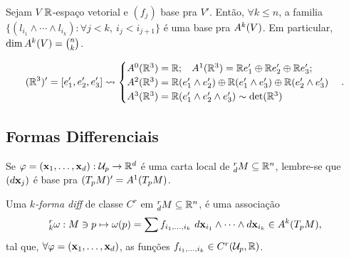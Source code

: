 \begin{theorem}
    Sejam \(V\) \(\mathbb{R}\)-espaço vetorial e \((f_j)\) base pra \(V'\). Então, \(\forall k\leq n \), a familia \(\{(l_{i_1}\wedge \cdots \wedge l_{i_k}): \forall j<k, \ i_j < i_{j+1}\}\) é uma base pra \(A^k(V)\). Em particular, \(\dim A^k(V) = \binom{n}{k}\).   
\end{theorem}
\begin{example}
    \- \vspace{-0.8cm}
    \[(\mathbb{R}^3)' = [e_1', e_2', e_3'] \leadsto  \begin{cases}
        A^0(\mathbb{R}^3) = \mathbb{R};\hspace{0.3cm} A^1(\mathbb{R}^3) = \mathbb{R} e_1' \oplus \mathbb{R} e_2'\oplus\mathbb{R} e_3';\\ 
        A^2(\mathbb{R}^3) = \mathbb{R} (e_1' \wedge e_2')\oplus \mathbb{R} (e_1' \wedge e_3')\oplus \mathbb{R} (e_2' \wedge e_3')\\ 
        A^3(\mathbb{R}^3) = \mathbb{R} ( e_1' \wedge e_2'\wedge e_3') \sim \det(\mathbb{R}^3) \\ 
    \end{cases}.\]   
\end{example}

\subsection*{Formas Differenciais}

\begin{note}
    Se \( \varphi = (\textbf{x}_1, \ldots, \textbf{x}_d): \mathcal{U}_p \to \mathbb{R}^d\) é uma carta local de \(^r_dM \subseteq \mathbb{R}^n\), lembre-se que \((d\textbf{x}_j)\) é base pra \((T_pM)' = A^1(T_pM)\). %
\end{note}
\- \vspace{-0.8cm}
\begin{definition}
    Uma \emph{$k$-forma diff} de classe \(C^r\) em \(^r_dM\subseteq \mathbb{R}^n\), é uma associação 
    \[^r_k\omega : M \ni p \mapsto \omega(p) = \sum f_{i_1, \ldots, i_k} \ d\textbf{x}_{i_1}\wedge \cdots \wedge d\textbf{x}_{i_k} \in A^k(T_pM), \] 
    tal que, \(\forall \varphi = (\textbf{x}_1, \ldots, \textbf{x}_d)\), as funções \(f_{i_1, \ldots, i_k}\in C^r ( \mathcal{U}_p,\mathbb{R})\).
\end{definition}

